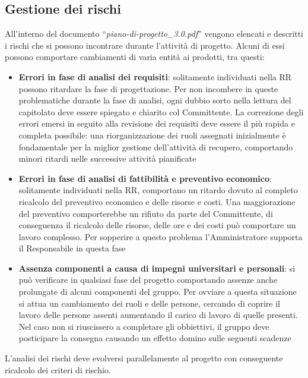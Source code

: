 \documentclass[a4paper,11pt]{article}
\begin{document}
\subsection{Gestione dei rischi}
All'interno del documento ``\textit{piano-di-progetto\_3.0.pdf}'' vengono elencati e descritti i rischi che si possono incontrare durante l'attivit\`a di progetto. Alcuni di essi possono comportare cambiamenti di varia entit\`a ai prodotti, tra questi:
\begin{itemize}
\item \textbf{Errori in fase di analisi dei requisiti}: solitamente individuati nella RR possono ritardare la fase di progettazione. Per non incombere in queste problematiche durante la fase di analisi, ogni dubbio sorto nella lettura del capitolato deve essere spiegato e chiarito col Committente. La correzione degli errori emersi in seguito alla revisione dei requisiti deve essere il pi\`u rapida e completa possibile: una riorganizzazione dei ruoli assegnati inizialmente \`e fondamentale per la miglior gestione dell'attivit\`a di recupero, comportando minori ritardi nelle successive attivit\`a pianificate
\item \textbf{Errori in fase di analisi di fattibilit\`a e preventivo economico}: solitamente individuati nella RR, comportano un ritardo dovuto al completo ricalcolo del preventivo economico e delle risorse e costi. Una maggiorazione del preventivo comporterebbe un rifiuto da parte del Committente, di conseguenza il ricalcolo delle risorse, delle ore e dei costi pu\`o comportare un lavoro complesso. Per sopperire a questo problema l'Amministratore supporta il Responsabile in questa fase
\item \textbf{Assenza componenti a causa di impegni universitari e personali}: si pu\`o verificare in qualsiasi fase del progetto comportando assenze anche prolungate di alcuni componenti del gruppo. Per ovviare a questa situazione si attua un cambiamento dei ruoli e delle persone, cercando di coprire il lavoro delle persone assenti aumentando il carico di lavoro di quelle presenti. Nel caso non si riuscissero a completare gli obbiettivi, il gruppo deve posticipare la consegna causando un effetto domino sulle seguenti scadenze
\end{itemize}
L'analisi dei rischi deve evolversi parallelamente al progetto con conseguente ricalcolo dei criteri di rischio. 
\end{document}
